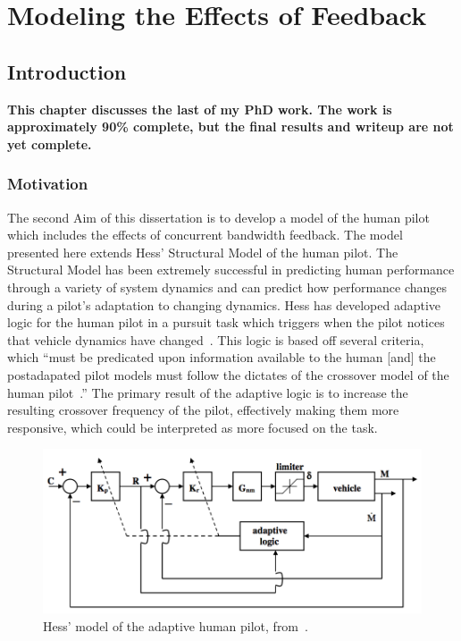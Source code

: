 \chapter{Modeling the Effects of Feedback}
\label{chapter:modeling}

\section{Introduction}
\textbf{\color{red} This chapter discusses the last of my PhD work.
    The work is approximately 90\% complete, but the final results and writeup are not yet complete.}

\subsection{Motivation}
The second Aim of this dissertation is to develop a model of the human pilot which includes the effects of concurrent bandwidth feedback.
The model presented here extends Hess' Structural Model of the human pilot.
The Structural Model has been extremely successful in predicting human performance through a variety of system dynamics and can predict how performance changes during a pilot's adaptation to changing dynamics.
Hess has developed adaptive logic for the human pilot in a pursuit task which triggers when the pilot notices that vehicle dynamics have changed~\citep{hess_modeling_2009}.
This logic is based off several criteria, which ``must be predicated upon information available to the human [and] the postadapated pilot models must follow the dictates of the crossover model of the human pilot~\citep{hess_modeling_2009}.''
The primary result of the adaptive logic is to increase the resulting crossover frequency of the pilot, effectively making them more responsive, which could be interpreted as more focused on the task.

\begin{figure}[tb]
    \begin{center}
        \includegraphics[width=0.8\linewidth]{figures/Modeling/Screen_Shot_2018-08-09_at_4_15_24_PM.png}
        \caption[Hess' model of the adaptive human pilot]{Hess' model of the adaptive human pilot, from~\citet{hess_modeling_2009}.}
        \label{figure:hesspursuit}
    \end{center}
\end{figure}


